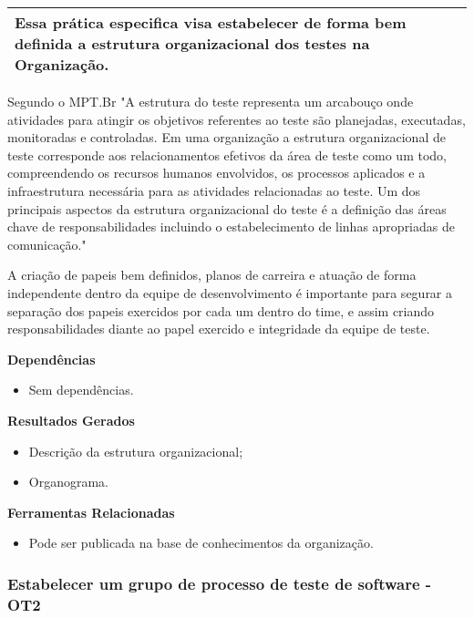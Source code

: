 \begin{table}[H]
\centering
\begin{tabular}{|p{130mm}|}
\hline
 Essa prática especifica visa estabelecer de forma bem definida a estrutura organizacional dos testes na Organização.\\ 
\hline
\end{tabular}
\end{table}

Segundo o MPT.Br \cite{GuiaMPTbr} "A estrutura do teste representa um arcabouço onde atividades para atingir os objetivos referentes ao teste são planejadas, executadas, monitoradas e controladas. Em uma organização a estrutura organizacional de teste corresponde aos relacionamentos efetivos da área de teste como um todo, compreendendo os recursos humanos envolvidos, os processos aplicados e a infraestrutura necessária para as atividades relacionadas ao teste. Um dos principais aspectos da estrutura organizacional do teste é a definição das áreas chave de responsabilidades incluindo o estabelecimento de linhas apropriadas de comunicação."

A criação de papeis bem definidos, planos de carreira e atuação de forma independente dentro da equipe de desenvolvimento é importante para segurar a separação dos papeis exercidos por cada um dentro do time, e assim criando responsabilidades diante ao papel exercido e integridade da equipe de teste.

\textbf{Dependências}
\begin{itemize}
    \item Sem dependências.
\end{itemize}

\textbf{Resultados Gerados}
\begin{itemize}
    \item Descrição da estrutura organizacional;
    \item Organograma.
\end{itemize}

\textbf{Ferramentas Relacionadas}
\begin{itemize}
    \item Pode ser publicada na base de conhecimentos da organização.
\end{itemize}

\subsubsection{Estabelecer um grupo de processo de teste de software - OT2}
\label{sec:ot2}

